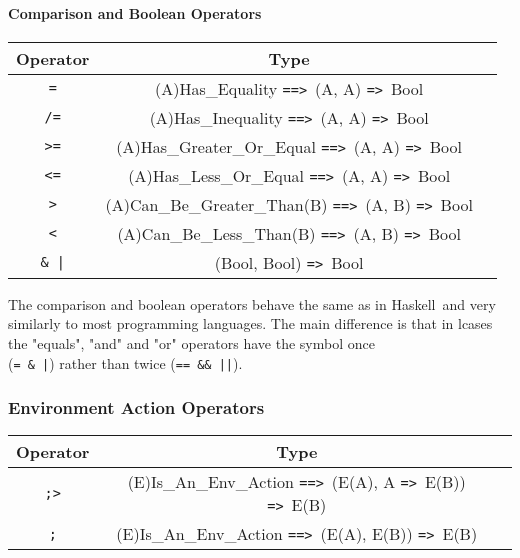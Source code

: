 \documentclass{article}
\def\H{Haskell}
\def\ra{\texttt{=>}\ }
\def\Ra{\texttt{==>}\ }
\begin{document}
\paragraph{Comparison and Boolean Operators}

\begin{center}
\begin{tabular}{ |c|c|c| } 
\hline
Operator & Type \\ 
\hline
\hline
\texttt{=} & (A)Has_Equality \Ra (A, A) \ra Bool \\
\hline
\texttt{/=} & (A)Has_Inequality \Ra (A, A) \ra Bool \\
\hline
\texttt{>=} & (A)Has_Greater_Or_Equal \Ra (A, A) \ra Bool \\
\hline
\texttt{<=} & (A)Has_Less_Or_Equal \Ra (A, A) \ra Bool \\
\hline
\texttt{>} & (A)Can_Be_Greater_Than(B) \Ra (A, B) \ra Bool \\
\hline
\texttt{<} & (A)Can_Be_Less_Than(B) \Ra (A, B) \ra Bool \\
\hline
\texttt{\& |} & (Bool, Bool) \ra Bool \\
\hline
\end{tabular}
\end{center}
The comparison and boolean operators behave the same as in \H\ and very
similarly to most programming languages. The main difference is that in lcases
the "equals", "and" and "or" operators have the symbol once \\(\texttt{= \& |})
rather than twice (\texttt{== \&\& ||}).

\subsubsection{Environment Action Operators}
\label{subsec:envacts}

\begin{center}
\begin{tabular}{ |c|c|c| } 
\hline
Operator & Type \\ 
\hline
\hline
\texttt{;>} & (E)Is_An_Env_Action \Ra (E(A), A \ra E(B)) \ra E(B) \\
\hline
\texttt{;} & (E)Is_An_Env_Action \Ra (E(A), E(B)) \ra E(B) \\
\hline
\end{tabular}
\end{center}
\end{document}
